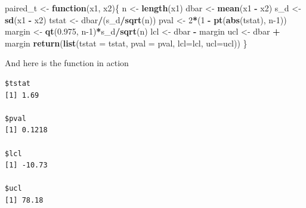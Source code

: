 \documentclass[
]{krantz}
\makeatletter
\newenvironment{Shaded}{\begin{snugshade}}{\end{snugshade}}
\newcommand{\ControlFlowTok}[1]{\textcolor[rgb]{0.27,0.27,0.27}{\textbf{#1}}}
\newcommand{\DataTypeTok}[1]{\textcolor[rgb]{0.27,0.27,0.27}{#1}}
\newcommand{\DecValTok}[1]{\textcolor[rgb]{0.06,0.06,0.06}{#1}}
\newcommand{\FloatTok}[1]{\textcolor[rgb]{0.06,0.06,0.06}{#1}}
\newcommand{\KeywordTok}[1]{\textcolor[rgb]{0.27,0.27,0.27}{\textbf{#1}}}
\newcommand{\NormalTok}[1]{#1}
\newcommand{\OperatorTok}[1]{\textcolor[rgb]{0.43,0.43,0.43}{\textbf{#1}}}
\newcommand{\StringTok}[1]{\textcolor[rgb]{0.5,0.5,0.5}{#1}}
\newenvironment{kframe}{%
\medskip{}
\setlength{\fboxsep}{.8em}
 \def\at@end@of@kframe{}%
 \ifinner\ifhmode%
  \def\at@end@of@kframe{\end{minipage}}%
  \begin{minipage}{\columnwidth}%
 \fi\fi%
 \def\FrameCommand##1{\hskip\@totalleftmargin \hskip-\fboxsep
 \colorbox{shadecolor}{##1}\hskip-\fboxsep
     \hskip-\linewidth \hskip-\@totalleftmargin \hskip\columnwidth}%
 \MakeFramed {\advance\hsize-\width
   \@totalleftmargin\z@ \linewidth\hsize
   \@setminipage}}%
 {\par\unskip\endMakeFramed%
 \at@end@of@kframe}
\renewenvironment{Shaded}{\begin{kframe}}{\end{kframe}}
\makeatother
\begin{document}
\begin{Shaded}
\begin{Highlighting}[]
\NormalTok{paired\_t \textless{}{-}}\StringTok{ }\ControlFlowTok{function}\NormalTok{(x1, x2)\{}
\NormalTok{    n \textless{}{-}}\StringTok{ }\KeywordTok{length}\NormalTok{(x1)}
\NormalTok{    dbar \textless{}{-}}\StringTok{ }\KeywordTok{mean}\NormalTok{(x1 }\OperatorTok{{-}}\StringTok{ }\NormalTok{x2)}
\NormalTok{    s\_d \textless{}{-}}\StringTok{ }\KeywordTok{sd}\NormalTok{(x1 }\OperatorTok{{-}}\StringTok{ }\NormalTok{x2)}
\NormalTok{    tstat \textless{}{-}}\StringTok{ }\NormalTok{dbar}\OperatorTok{/}\NormalTok{(s\_d}\OperatorTok{/}\KeywordTok{sqrt}\NormalTok{(n))}
\NormalTok{    pval \textless{}{-}}\StringTok{ }\DecValTok{2}\OperatorTok{*}\NormalTok{(}\DecValTok{1} \OperatorTok{{-}}\StringTok{ }\KeywordTok{pt}\NormalTok{(}\KeywordTok{abs}\NormalTok{(tstat), n}\DecValTok{{-}1}\NormalTok{))}
\NormalTok{    margin \textless{}{-}}\StringTok{ }\KeywordTok{qt}\NormalTok{(}\FloatTok{0.975}\NormalTok{, n}\DecValTok{{-}1}\NormalTok{)}\OperatorTok{*}\NormalTok{s\_d}\OperatorTok{/}\KeywordTok{sqrt}\NormalTok{(n)}
\NormalTok{    lcl \textless{}{-}}\StringTok{ }\NormalTok{dbar }\OperatorTok{{-}}\StringTok{ }\NormalTok{margin}
\NormalTok{    ucl \textless{}{-}}\StringTok{ }\NormalTok{dbar }\OperatorTok{+}\StringTok{ }\NormalTok{margin}
    \KeywordTok{return}\NormalTok{(}\KeywordTok{list}\NormalTok{(}\DataTypeTok{tstat =}\NormalTok{ tstat, }\DataTypeTok{pval =}\NormalTok{ pval, }\DataTypeTok{lcl=}\NormalTok{lcl, }\DataTypeTok{ucl=}\NormalTok{ucl))}
\NormalTok{\}}
\end{Highlighting}
\end{Shaded}

And here is the function in action

\begin{Shaded}
\end{Shaded}

\begin{verbatim}
$tstat
[1] 1.69

$pval
[1] 0.1218

$lcl
[1] -10.73

$ucl
[1] 78.18
\end{verbatim}
\end{document}
